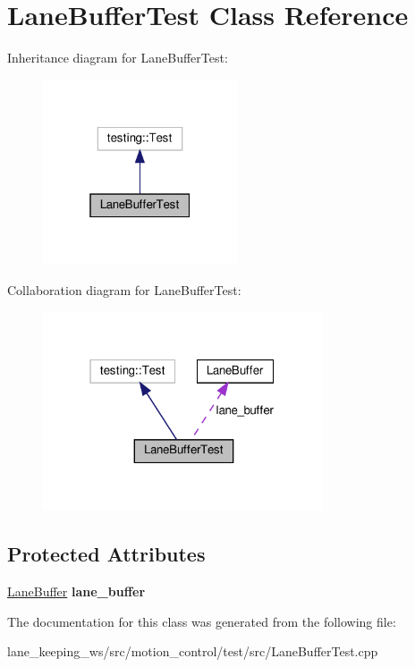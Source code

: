 \hypertarget{classLaneBufferTest}{}\section{Lane\+Buffer\+Test Class Reference}
\label{classLaneBufferTest}


Inheritance diagram for Lane\+Buffer\+Test\+:
\nopagebreak
\begin{figure}[H]
\begin{center}
\leavevmode
\includegraphics[width=163pt]{classLaneBufferTest__inherit__graph}
\end{center}
\end{figure}


Collaboration diagram for Lane\+Buffer\+Test\+:
\nopagebreak
\begin{figure}[H]
\begin{center}
\leavevmode
\includegraphics[width=235pt]{classLaneBufferTest__coll__graph}
\end{center}
\end{figure}
\subsection*{Protected Attributes}
\begin{DoxyCompactItemize}
\item 
\mbox{\label{classLaneBufferTest_a394943c7852ef49fd6abad2ed77ff7b2}} 
\hyperlink{classLaneBuffer}{Lane\+Buffer} {\bfseries lane\+\_\+buffer}
\end{DoxyCompactItemize}


The documentation for this class was generated from the following file\+:\begin{DoxyCompactItemize}
\item 
lane\+\_\+keeping\+\_\+ws/src/motion\+\_\+control/test/src/Lane\+Buffer\+Test.\+cpp\end{DoxyCompactItemize}
